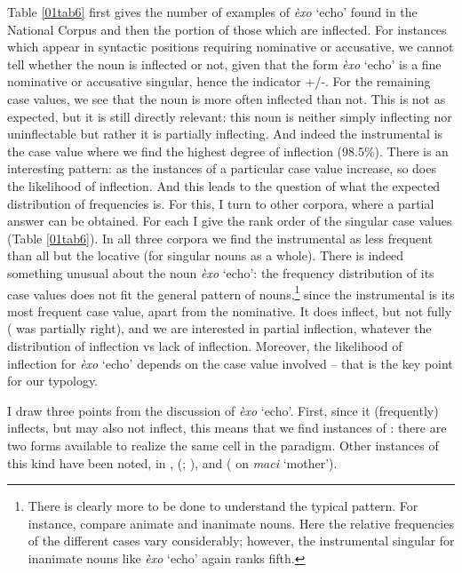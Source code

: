 \documentclass[output=paper,colorlinks,citecolor=brown]{langscibook}
\begin{document}
Table \ref{01tab6} first gives the number of examples of \textit{èxo} `echo' found in the  National Corpus and then the portion of those which are inflected. For instances which appear in syntactic positions requiring nominative or accusative, we cannot tell whether the noun is inflected or not, given that the form \textit{èxo} `echo' is a fine nominative or accusative singular, hence the indicator +/-. For the remaining case values, we see that the noun is more often inflected than not. This is not as expected, but it is still directly relevant: this noun is neither simply inflecting nor uninflectable but rather it is partially inflecting. And indeed the instrumental is the case value where we find the highest degree of inflection (98.5\%). There is an interesting pattern: as the instances of a particular case value increase, so does the likelihood of inflection. And this leads to the question of what the expected distribution of frequencies is. For this, I turn to other corpora, where a partial answer can be obtained. For each I give the rank order of the singular case values (Table \ref{01tab6}). In all three corpora we find the instrumental as less frequent than all but the locative (for singular nouns as a whole). There is indeed something unusual about the noun \textit{èxo} `echo': the frequency distribution of its case values does not fit the general pattern of nouns,\footnote{There is clearly more to be done to understand the typical pattern. For instance, \citet[Table \ref{01tab6}]{slioussarsamoilova2015} compare animate and inanimate nouns. Here the relative frequencies of the different cases vary considerably; however, the instrumental singular for inanimate nouns like \textit{èxo} `echo' again ranks fifth.} since the instrumental is its most frequent case value, apart from the nominative. It does inflect, but not fully (\citealt{unbegaun1947} was partially right), and we are interested in partial inflection, whatever the distribution of inflection vs lack of inflection. Moreover, the likelihood of inflection for \textit{èxo} `echo' depends on the case value involved -- that is the key point for our typology.

I draw three points from the discussion of  \textit{èxo} `echo'. First, since it (frequently) inflects, but may also not inflect, this means that we find instances of  \citep{thornton2019-overabundance}: there are two forms available to realize the same cell in the paradigm. Other instances of this kind have been noted, in  \citep[12]{auty1968},  (\citealt[120]{swan2002}; \citealt[53]{krzyzanowski2020}), and  (\citealt[905]{mayo1993} on \textit{maci} `mother').
\end{document}
